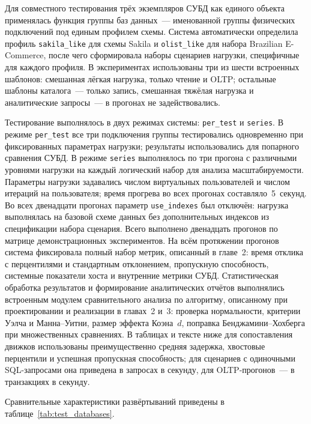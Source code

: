 Для совместного тестирования трёх экземпляров СУБД как единого объекта применялась функция группы баз данных~--- именованной группы физических подключений под единым профилем схемы. Система автоматически определила профиль \texttt{sakila\_like} для схемы Sakila и \texttt{olist\_like} для набора Brazilian E-Commerce, после чего сформировала наборы сценариев нагрузки, специфичные для каждого профиля. В экспериментах использованы три из шести встроенных шаблонов: смешанная лёгкая нагрузка, только чтение и OLTP; остальные шаблоны каталога~--- только запись, смешанная тяжёлая нагрузка и аналитические запросы~--- в прогонах не задействовались.

Тестирование выполнялось в двух режимах системы: \texttt{per\_test} и \texttt{series}. В режиме \texttt{per\_test} все три подключения группы тестировались одновременно при фиксированных параметрах нагрузки; результаты использовались для попарного сравнения СУБД. В режиме \texttt{series} выполнялось по три прогона с различными уровнями нагрузки на каждый логический набор для анализа масштабируемости. Параметры нагрузки задавались числом виртуальных пользователей и числом итераций на пользователя; время прогрева во всех прогонах составляло~5~секунд. Во всех двенадцати прогонах параметр \texttt{use\_indexes} был отключён: нагрузка выполнялась на базовой схеме данных без дополнительных индексов из спецификации набора сценария. Всего выполнено двенадцать прогонов по матрице демонстрационных экспериментов. На всём протяжении прогонов система фиксировала полный набор метрик, описанный в главе~2: время отклика с перцентилями и стандартным отклонением, пропускную способность, системные показатели хоста и внутренние метрики СУБД. Статистическая обработка результатов и формирование аналитических отчётов выполнялись встроенным модулем сравнительного анализа по алгоритму, описанному при проектировании и реализации в главах~2 и~3: проверка нормальности, критерии Уэлча и Манна--Уитни, размер эффекта Коэна~$d$, поправка Бенджамини--Хохберга при множественных сравнениях. В таблицах и тексте ниже для сопоставления движков использованы преимущественно средняя задержка, хвостовые перцентили и успешная пропускная способность; для сценариев с одиночными SQL-запросами она приведена в запросах в секунду, для OLTP-прогонов~--- в транзакциях в секунду.

Сравнительные характеристики развёртываний приведены в таблице~\ref{tab:test_databases}.


